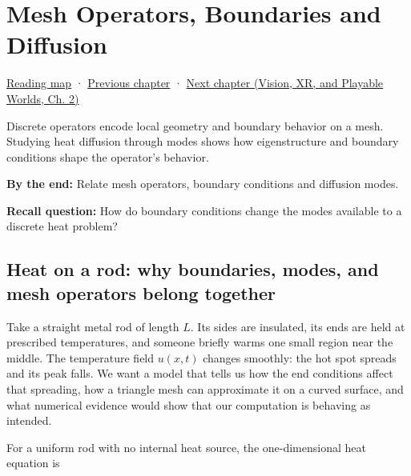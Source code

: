 \chapter{Mesh Operators, Boundaries and Diffusion}\label{04-visual-computing-ii-ch030-mesh-operators-boundaries-and-diffusion}\hypertarget{04-visual-computing-ii-ch030}{}\label{stagechapter:04-visual-computing-ii-ch030}

\hypertarget{04-visual-computing-ii-ch030-mesh-operators-boundaries-and-diffusion}{}

\hyperref[volume-reading-map]{Reading map} · \hyperref[04-visual-computing-ii-ch029-acceleration-structures-and-robust-queries]{Previous chapter} · \href{../07-Vision-XR-and-Playable-Worlds/main.pdf\#nameddest=04-visual-computing-ii-ch031-learning-a-visual-classifier}{Next chapter (Vision, XR, and Playable Worlds, Ch. 2)}

Discrete operators encode local geometry and boundary behavior on a mesh. Studying heat diffusion through modes shows how eigenstructure and boundary conditions shape the operator's behavior.

\textbf{By the end:} Relate mesh operators, boundary conditions and diffusion modes.

\textbf{Recall question:} How do boundary conditions change the modes available to a discrete heat problem?

\section{Heat on a rod: why boundaries, modes, and mesh operators belong together}\label{04-visual-computing-ii-ch030-heat-on-a-rod-why-boundaries-modes-and-mesh-operators-belong-together}

\hypertarget{04-visual-computing-ii-ch030-heat-on-a-rod-why-boundaries-modes-and-mesh-operators-belong-together}{}

Take a straight metal rod of length \(L\). Its sides are insulated, its ends are held at prescribed temperatures, and someone briefly warms one small region near the middle. The temperature field \(u(x,t)\) changes smoothly: the hot spot spreads and its peak falls. We want a model that tells us how the end conditions affect that spreading, how a triangle mesh can approximate it on a curved surface, and what numerical evidence would show that our computation is behaving as intended.

For a uniform rod with no internal heat source, the one-dimensional heat equation is

